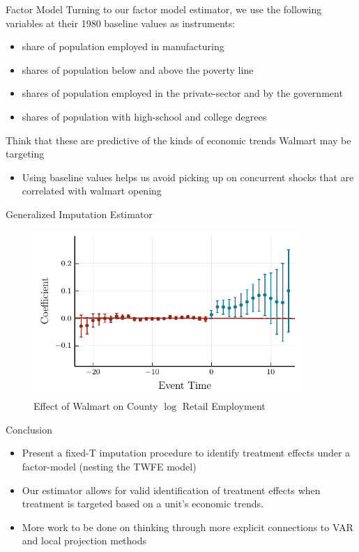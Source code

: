 \documentclass[aspectratio=43,t]{beamer}
\begin{document}
\begin{frame}{Factor Model}
  Turning to our factor model estimator, we use the following variables at their 1980 baseline values as instruments:
  \begin{itemize}
    \item share of population employed in manufacturing 
    \item shares of population below and above the poverty line
    \item shares of population employed in the private-sector and by the government 
    \item shares of population with high-school and college degrees
  \end{itemize}

  \smallskip\pause
  Think that these are predictive of the kinds of economic trends Walmart may be targeting
  \begin{itemize}
    \item Using baseline values helps us avoid picking up on concurrent shocks that are correlated with walmart opening
  \end{itemize}
\end{frame}

\begin{frame}{Generalized Imputation Estimator}
  \begin{figure}
    \caption{Effect of Walmart on County $\log$ Retail Employment}
    \includegraphics[width = 0.9\textwidth]{../../figures/factor_retail_p_2_bootstrap_1000.pdf}
  \end{figure}
\end{frame}

\begin{frame}{Conclusion}
  \begin{itemize}
    \item Present a fixed-T imputation procedure to identify treatment effects under a factor-model (nesting the TWFE model)
    
    \item Our estimator allows for valid identification of treatment effects when treatment is targeted based on a unit's economic trends.
    
    \item More work to be done on thinking through more explicit connections to VAR and local projection methods \citep{dube2022local,plagborg2021local}
  \end{itemize}
\end{frame}
\end{document}
